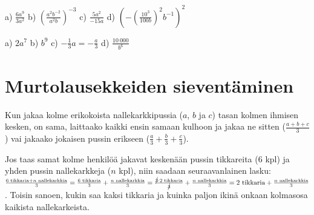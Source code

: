     \begin{tehtava}
        a) $\frac{6a^9}{3a^2}$ \qquad
        b) $(\frac{a^2b^{-2}}{a^2b})^{-3}$ \qquad
        c) $\frac{5a^2}{-15a}$ \qquad
        d) $\left(-(\frac{10^3}{100b})^2 b^{-1} \right )^2$
        
        \begin{vastaus}
            a) $2a^7$ \qquad
            b) $b^9$ \qquad
            c) $-\frac{1}{3}a = -\frac{a}{3}$ \qquad
            d) $\frac{10\ 000}{b^6}$
        \end{vastaus}
    \end{tehtava}

\section{Murtolausekkeiden sieventäminen}


Kun jakaa kolme erikokoista nallekarkkipussia ($a$, $b$ ja $c$) tasan kolmen ihmisen kesken, on sama, laittaako kaikki ensin samaan kulhoon ja jakaa ne sitten ($\frac{a+b+c}{3}$) vai jakaako jokaisen pussin erikseen ($ \frac{a}{3} + \frac{b}{3} + \frac{c}{3}$).

Jos taas samat kolme henkilöä jakavat keskenään pussin tikkareita ($6$ kpl) ja yhden pussin nallekarkkeja ($n$ kpl), niin saadaan seuraavanlainen lasku: $ \frac{6\text{ tikkaria}+n\text{ nallekarkkia}}{3} = \frac{6\text{ tikkaria}}{3} + \frac{n\text{ nallekarkkia}}{3} = \frac{\cancel{3} \cdot 2\text{ tikkaria}}{\cancel{3}} + \frac{n\text{ nallekarkkia}}{3} = 2\text{ tikkaria} + \frac{n\text{ nallekarkkia}}{3}$. Toisin sanoen, kukin saa kaksi tikkaria ja kuinka paljon ikinä onkaan kolmasosa kaikista nallekarkeista.


